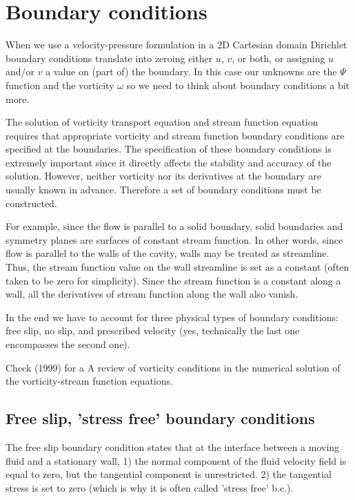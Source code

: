 \section{Boundary conditions}

When we use a velocity-pressure formulation in a 2D Cartesian domain Dirichlet boundary conditions 
translate into zeroing either $u$, $v$, or both, or assigning $u$ and/or $v$ a value on 
(part of) the boundary. In this case our unknowns are the $\Psi$ function and the vorticity $\omega$ 
so we need to think about boundary conditions a bit more.

The solution of vorticity transport equation and stream function equation requires that appropriate
vorticity and stream function boundary conditions are specified at the boundaries. The specification
of these boundary conditions is extremely important since it directly affects the stability and accuracy
of the solution. However, neither vorticity nor its derivatives at the boundary
are usually known in advance. Therefore a set of boundary conditions must be constructed.

For example, since the flow is parallel to a solid boundary, solid boundaries and symmetry planes
are surfaces of constant stream function. In other words, since flow is parallel to the walls of the cavity, walls may be treated as streamline. Thus, the stream function value on the wall streamline is set as a constant (often taken to be zero for simplicity). Since the stream function is a constant along a wall, all the derivatives of stream function along the wall also vanish.

In the end we have to account for three physical types of boundary conditions:
free slip, no slip, and prescribed velocity (yes, technically the last one encompasses the second one).

Check \textcite{napq99} (1999) for a A review of vorticity conditions in the numerical solution of the vorticity-stream function equations.

\subsection{Free slip, 'stress free' boundary conditions}

The free slip boundary condition states that at the interface between a moving fluid and a stationary wall, 
1) the normal component of the fluid velocity field is equal to zero, but the tangential component is unrestricted. 
2) the tangential stress is set to zero (which is why it is often called 'stress free' b.c.).

